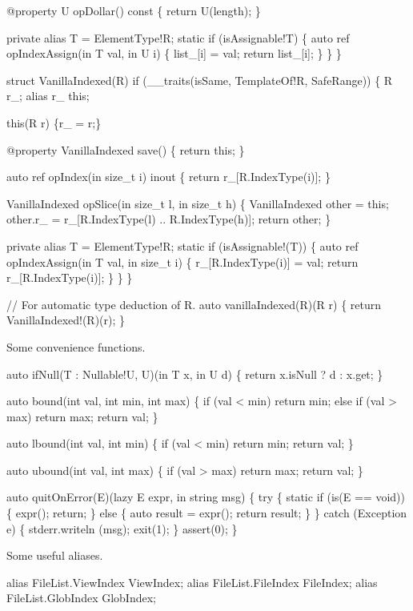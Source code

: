   @property
  U opDollar() const \{ return U(length); \}

  private alias T = ElementType!R;
  static if (isAssignable!T) \{
    auto ref opIndexAssign(in T val, in U i) \{
      list_[i] = val;
      return list_[i];
    \}
  \}
\}

struct VanillaIndexed(R)
  if (__traits(isSame, TemplateOf!R, SafeRange))
\{
  R r_;
  alias r_ this;

  this(R r) \{r_ = r;\}

  @property
  VanillaIndexed save() \{ return this; \}

  auto ref opIndex(in size_t i) inout \{
    return r_[R.IndexType(i)];
  \}

  VanillaIndexed opSlice(in size_t l, in size_t h)
  \{
    VanillaIndexed other = this;
    other.r_ = r_[R.IndexType(l) .. R.IndexType(h)];
    return other;
  \}

  private alias T = ElementType!R;
  static if (isAssignable!(T)) \{
    auto ref opIndexAssign(in T val, in size_t i) \{
      r_[R.IndexType(i)] = val;
      return r_[R.IndexType(i)];
    \}
  \}
\}

// For automatic type deduction of R.
auto vanillaIndexed(R)(R r)
\{
  return VanillaIndexed!(R)(r);
\}

\nwendcode{}Some convenience functions.

\nwenddocs{}\endmoddef\nwstartdeflinemarkup\nwenddeflinemarkup
auto ifNull(T : Nullable!U, U)(in T x, in U d)
\{
  return x.isNull ? d : x.get;
\}

auto bound(int val, int min, int max)
\{
  if (val < min) return min;
  else if (val > max) return max;
  return val;
\}

auto lbound(int val, int min)
\{
  if (val < min) return min;
  return val;
\}

auto ubound(int val, int max)
\{
  if (val > max) return max;
  return val;
\}

auto quitOnError(E)(lazy E expr, in string msg)
\{
  try \{
    static if (is(E == void)) \{
      expr();
      return;
    \} else \{
      auto result = expr();
      return result;
    \}
  \} catch (Exception e) \{
    stderr.writeln (msg);
    exit(1);
  \}
  assert(0);
\}


\nwendcode{}Some useful aliases.

\nwenddocs{}\endmoddef\nwstartdeflinemarkup\nwenddeflinemarkup
alias FileList.ViewIndex ViewIndex;
alias FileList.FileIndex FileIndex;
alias FileList.GlobIndex GlobIndex;

